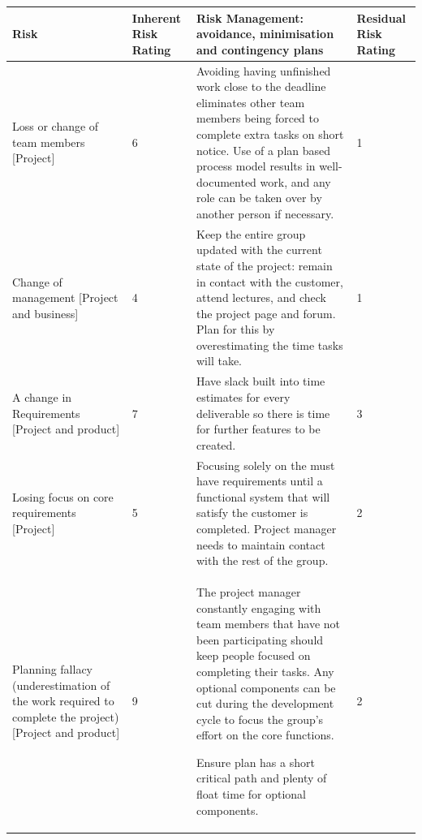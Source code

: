 \documentclass[]{IEEEtran}
\begin{document}
	
	\begin{table}[h]
	
	\begin{tabular}{| m{4cm} | m{1cm} | m{9.5cm} | m{1.5cm} | }
	
		\hline
		
		Risk & Inherent Risk Rating & Risk Management: avoidance, minimisation and contingency plans & Residual Risk Rating \\ 
		
		\hline
		
		Loss or change of team members [Project] & 
		6 & 
		Avoiding having unfinished work close to the deadline eliminates other team members being forced to complete extra tasks on short notice. Use of a plan based process model results in well-documented work, and any role can be taken over by another person if necessary. &
		1 \\
		
		\hline
		
		Change of management [Project and business] & 
		4 & 
		Keep the entire group updated with the current state of the project: remain in contact with the customer, attend lectures, and check the project page and forum. Plan for this by overestimating the time tasks will take. & 
		1 \\
		
		\hline
		
		A change in Requirements [Project and product] & 
		7 & 
		Have slack built into time estimates for every deliverable so there is time for further features to be created. & 
		3 \\
		
		\hline
		
		Losing focus on core requirements [Project] & 
		5 & 
		Focusing solely on the must have requirements until a functional system that will satisfy the customer is completed. Project manager needs to maintain contact with the rest of the group. & 
		2 \\
		
		\hline
		
		Planning fallacy (underestimation of the work required to complete the project) [Project and product] & 
		9 & 
		The project manager constantly engaging with team members that have not been participating should keep people focused on completing their tasks. Any optional components can be cut during the development cycle to focus the group's effort on the core functions.
		
		 Ensure plan has a short critical path and plenty of float time for optional components. & 
		2 \\
		

\end{tabular}
\end{table}
\end{document}
